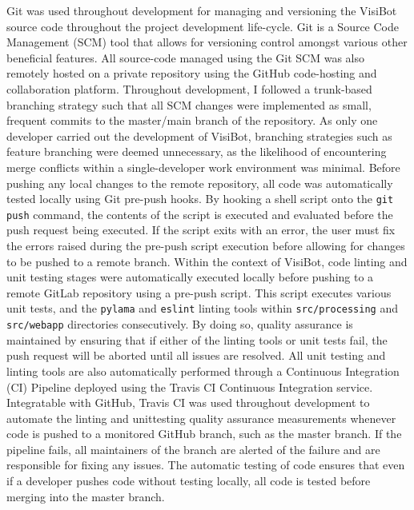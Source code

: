 Git \citep{Git} was used throughout development for managing and versioning the VisiBot source code throughout the project development life-cycle. Git is a Source Code Management (SCM) tool that allows for versioning control amongst various other beneficial features. All source-code managed using the Git SCM was also remotely hosted on a private repository using the GitHub \citep{GitHub} code-hosting and collaboration platform. Throughout development, I followed a trunk-based branching strategy such that all SCM changes were implemented as small, frequent commits to the master/main branch of the repository. As only one developer carried out the development of VisiBot, branching strategies such as feature branching were deemed unnecessary, as the likelihood of encountering merge conflicts within a single-developer work environment was minimal. Before pushing any local changes to the remote repository, all code was automatically tested locally using Git pre-push hooks. \citep{PrePushHooks} By hooking a shell script onto the \texttt{git push} command, the contents of the script is executed and evaluated before the push request being executed. If the script exits with an error, the user must fix the errors raised during the pre-push script execution before allowing for changes to be pushed to a remote branch. Within the context of VisiBot, code linting and unit testing stages were automatically executed locally before pushing to a remote GitLab repository using a pre-push script. This script executes various unit tests, and the \texttt{pylama} and \texttt{eslint} linting tools within \texttt{src/processing} and \texttt{src/webapp} directories consecutively. By doing so, quality assurance is maintained by ensuring that if either of the linting tools or unit tests fail, the push request will be aborted until all issues are resolved. All unit testing and linting tools are also automatically performed through a Continuous Integration (CI) Pipeline deployed using the Travis CI \citep{TravisCI} Continuous Integration service. Integratable with GitHub, Travis CI was used throughout development to automate the linting and unittesting quality assurance measurements whenever code is pushed to a monitored GitHub branch, such as the master branch. If the pipeline fails, all maintainers of the branch are alerted of the failure and are responsible for fixing any issues. The automatic testing of code ensures that even if a developer pushes code without testing locally, all code is tested before merging into the master branch.
